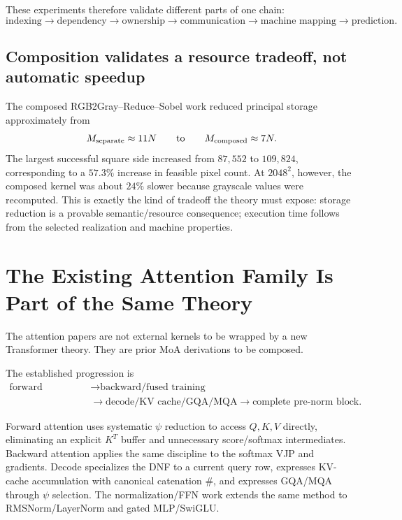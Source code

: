 \documentclass[11pt]{article}
\begin{document}
These experiments therefore validate different parts of one chain:
\[
\boxed{
\text{indexing}
\rightarrow
\text{dependency}
\rightarrow
\text{ownership}
\rightarrow
\text{communication}
\rightarrow
\text{machine mapping}
\rightarrow
\text{prediction}.
}
\]

\subsection{Composition validates a resource tradeoff, not automatic speedup}

The composed RGB2Gray--Reduce--Sobel work reduced principal storage approximately from
\[
M_{\rm separate}\approx 11N
\qquad\text{to}\qquad
M_{\rm composed}\approx 7N.
\]
The largest successful square side increased from \(87{,}552\) to \(109{,}824\), corresponding
to a \(57.3\%\) increase in feasible pixel count.  At \(2048^2\), however, the composed kernel was
about \(24\%\) slower because grayscale values were recomputed.  This is exactly the kind of
tradeoff the theory must expose: storage reduction is a provable semantic/resource consequence;
execution time follows from the selected realization and machine properties.

\section{The Existing Attention Family Is Part of the Same Theory}

The attention papers are not external kernels to be wrapped by a new Transformer theory.  They
are prior MoA derivations to be composed.

The established progression is
\[
\boxed{\begin{aligned}
\text{forward attention}&\rightarrow\text{backward/fused training}\\
&\rightarrow\text{decode/KV cache/GQA/MQA}\rightarrow\text{complete pre-norm block}.
\end{aligned}}
\]

Forward attention uses systematic \(\psi\) reduction to access \(Q,K,V\) directly, eliminating an
explicit \(K^T\) buffer and unnecessary score/softmax intermediates.  Backward attention applies
the same discipline to the softmax VJP and gradients.  Decode specializes the DNF to a current
query row, expresses KV-cache accumulation with canonical catenation \(\#\), and expresses
GQA/MQA through \(\psi\) selection.  The normalization/FFN work extends the same method to
RMSNorm/LayerNorm and gated MLP/SwiGLU.
\end{document}
